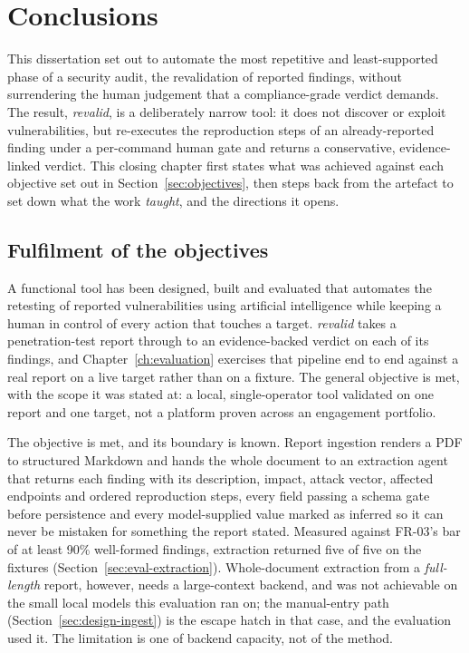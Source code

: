 \chapter{Conclusions}
\label{ch:conclusions}

\setlength{\emergencystretch}{3em}

This dissertation set out to automate the most repetitive and least-supported phase
of a security audit, the revalidation of reported findings, without
surrendering the human judgement that a compliance-grade verdict demands. The result,
\emph{revalid}, is a deliberately narrow tool: it does not discover or exploit
vulnerabilities, but re-executes the reproduction steps of an already-reported finding
under a per-command human gate and returns a conservative, evidence-linked verdict.
This closing chapter first states what was achieved against each objective set out in
Section~\ref{sec:objectives}, then steps back from the artefact to set down what the
work \emph{taught}, and the directions it opens.

\section{Fulfilment of the objectives}
\label{sec:objectives-met}

 A functional tool has been designed, built and evaluated that
automates the retesting of reported vulnerabilities using artificial intelligence while
keeping a human in control of every action that touches a target. \emph{revalid} takes a
penetration-test report through to an evidence-backed verdict on each of its findings,
and Chapter~\ref{ch:evaluation} exercises that pipeline end to end against a real report
on a live target rather than on a fixture. The general objective is met, with the scope
it was stated at: a local, single-operator tool validated on one report and one target,
not a platform proven across an engagement portfolio.

 The objective is met, and its
boundary is known. Report ingestion renders a PDF to structured Markdown and hands the
whole document to an extraction agent that returns each finding with its description,
impact, attack vector, affected endpoints and ordered reproduction steps, every field
passing a schema gate before persistence and every model-supplied value marked as
inferred so it can never be mistaken for something the report stated. Measured against
FR-03's bar of at least 90\% well-formed findings, extraction returned five of five on
the fixtures (Section~\ref{sec:eval-extraction}). Whole-document extraction from a
\emph{full-length} report, however, needs a large-context backend, and was not achievable
on the small local models this evaluation ran on; the manual-entry path
(Section~\ref{sec:design-ingest}) is the escape hatch in that case, and the evaluation
used it. The limitation is one of backend capacity, not of the method.

